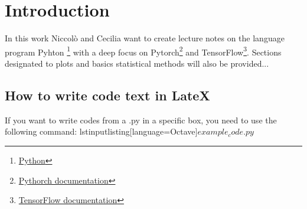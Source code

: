 

\chapter{Introduction}

In this work Niccolò and Cecilia want to create lecture notes
 on the language program Pyhton \footnote{\href{https://www.python.org/}{Python}}
with a deep focus on Pytorch\footnote{\href{https://pytorch.org/docs/stable/index.html}{Pythorch documentation}}
  and TensorFlow\footnote{\href{https://www.tensorflow.org/api_docs}{TensorFlow documentation}}.
 Sections designated to plots and basics statistical methods will also be provided...


 \section{How to write code text in LateX}

 If you want to write codes from a .py in a specific box, you need to  use the following command:
 lstinputlisting[language=Octave]{$example_code.py$}
 


